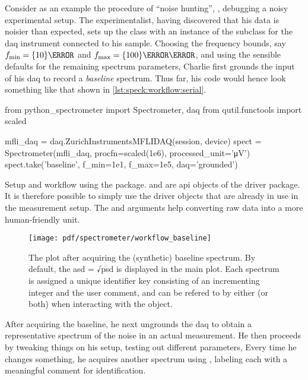 Consider as an example the procedure of \enquote{noise hunting}, \ie, debugging a noisy experimental setup.
The experimentalist,
having discovered that his data is noisier than expected, sets up the  class with an instance of the  subclass for the \gls{daq} instrument connected to his sample.
Choosing the frequency bounds, say $\fmin = \qty{10}{\hertz}$ and $\fmax = \qty{100}{\kilo\hertz}$, and using the sensible defaults for the remaining spectrum parameters, Charlie first grounds the input of his \gls{daq} to record a \emph{baseline} spectrum.
Thus far, his code would hence look something like that shown in \cref{lst:speck:workflow:serial}.

\begin{listing}[htpb]
    \begin{py}
from python_spectrometer import Spectrometer, daq
from qutil.functools import scaled

mfli_daq = daq.ZurichInstrumentsMFLIDAQ(session, device)
spect = Spectrometer(mfli_daq, procfn=scaled(1e6),
                     processed_unit='μV')
spect.take('baseline', f_min=1e1, f_max=1e5, daq='grounded')
    \end{py}
    \caption[\pyspeck workflow]{
        Setup and workflow using the \pyspeck package.
         and  are \gls{api} objects of the  driver package.
        It is therefore possible to simply use the driver objects that are already in use in the measurement setup.
        The  and  arguments help converting raw data into a more human-friendly unit.
    }
    \label{lst:speck:workflow:serial}
\end{listing}
\begin{figure}[htpb]
    \centering
    \texttt{[image: pdf/spectrometer/workflow\_baseline]}
    \caption{
        The \pyspeck plot after acquiring the (synthetic) baseline spectrum.
        By default, the \gls{asd} = √\gls{psd} is displayed in the main plot.
        Each spectrum is assigned a unique identifier key consisting of an incrementing integer and the user comment, and can be refered to by either (or both) when interacting with the object.
    }
    \label{fig:speck:software:workflow_baseline}
\end{figure}

After acquiring the baseline, he next ungrounds the \gls{daq} to obtain a representative spectrum of the noise in an actual measurement.
He then proceeds by tweaking things on his setup, testing out different parameters, \etc
Every time he changes something, he acquires another spectrum using , labeling each with a meaningful comment for identification.

